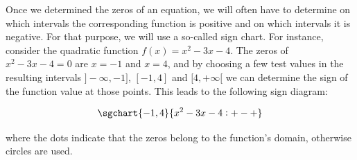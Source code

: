 %
%  
%    
% 
%  
%
%
%
%
%

\fi

Once we determined the zeros of an equation, we will often have to determine on which intervals the corresponding function is positive and on which intervals it is negative. For that purpose, we will use a so-called sign chart. For instance, consider the quadratic function $f(x)=x^2-3x-4$. The zeros of $x^2-3x-4=0$ are $x=-1$ and $x=4$, and by choosing a few test values in the resulting intervals $]-\infty,-1]$, $[-1,4]$ and $[4,+\infty[$ we can determine the sign of the function value at those points. This leads to the following sign diagram:

$$\sgchart{-1, 4} {x^2-3x-4: +-+}$$

where the dots indicate that the zeros belong to the function's domain, otherwise circles are used. 

